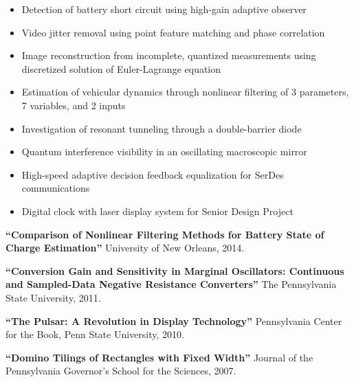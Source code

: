 \documentclass[9pt]{extarticle}
\begin{document}
\begin{itemize}[itemsep=-3pt]
\item Detection of battery short circuit using high-gain adaptive observer
\item Video jitter removal using point feature matching and phase correlation
\item Image reconstruction from incomplete, quantized measurements using discretized solution of Euler-Lagrange equation
\item Estimation of vehicular dynamics through nonlinear filtering of 3 parameters, 7 variables, and 2 inputs
\item Investigation of resonant tunneling through a double-barrier diode
\item Quantum interference visibility in an oscillating macroscopic mirror
\item High-speed adaptive decision feedback equalization for SerDes communications
\item Digital clock with laser display system for Senior Design Project
\end{itemize}
\vspace{-3pt}

\begin{description}[itemsep=-3pt,leftmargin=30.5pt,itemindent=-2em]
\item[] \textbf{``Comparison of Nonlinear Filtering Methods for Battery State of Charge Estimation''} University of New Orleans, 2014.
\item[] \textbf{``Conversion Gain and Sensitivity in Marginal Oscillators: Continuous and Sampled-Data Negative Resistance Converters''} The Pennsylvania State University, 2011.
\item[] \textbf{``The Pulsar: A Revolution in Display Technology''} Pennsylvania Center for the Book, Penn State University, 2010.
\item[] \textbf{``Domino Tilings of Rectangles with Fixed Width''} Journal of the Pennsylvania Governor's School for the Sciences, 2007.
\end{description}
\vspace{-3pt}

\end{document}
